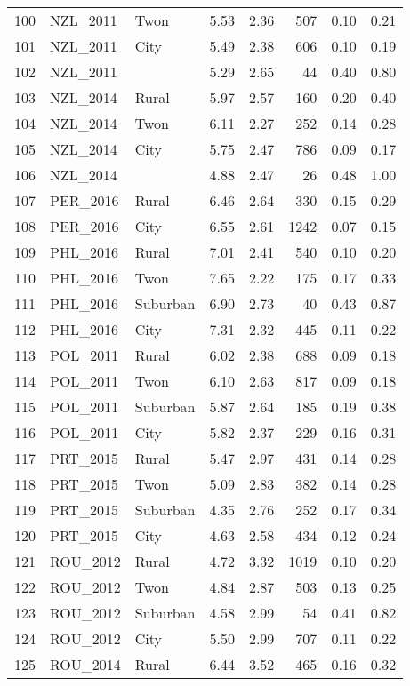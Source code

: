 \documentclass[12pt, titlepage]{article}
\begin{document}
\begin{table}[ht]
\begin{tabular}{rllrrrrr}
		100 & NZL\_2011 & Twon & 5.53 & 2.36 & 507 & 0.10 & 0.21 \\ 
		101 & NZL\_2011 & City & 5.49 & 2.38 & 606 & 0.10 & 0.19 \\ 
		102 & NZL\_2011 &  & 5.29 & 2.65 &  44 & 0.40 & 0.80 \\ 
		103 & NZL\_2014 & Rural & 5.97 & 2.57 & 160 & 0.20 & 0.40 \\ 
		104 & NZL\_2014 & Twon & 6.11 & 2.27 & 252 & 0.14 & 0.28 \\ 
		105 & NZL\_2014 & City & 5.75 & 2.47 & 786 & 0.09 & 0.17 \\ 
		106 & NZL\_2014 &  & 4.88 & 2.47 &  26 & 0.48 & 1.00 \\ 
		107 & PER\_2016 & Rural & 6.46 & 2.64 & 330 & 0.15 & 0.29 \\ 
		108 & PER\_2016 & City & 6.55 & 2.61 & 1242 & 0.07 & 0.15 \\ 
		109 & PHL\_2016 & Rural & 7.01 & 2.41 & 540 & 0.10 & 0.20 \\ 
		110 & PHL\_2016 & Twon & 7.65 & 2.22 & 175 & 0.17 & 0.33 \\ 
		111 & PHL\_2016 & Suburban & 6.90 & 2.73 &  40 & 0.43 & 0.87 \\ 
		112 & PHL\_2016 & City & 7.31 & 2.32 & 445 & 0.11 & 0.22 \\ 
		113 & POL\_2011 & Rural & 6.02 & 2.38 & 688 & 0.09 & 0.18 \\ 
		114 & POL\_2011 & Twon & 6.10 & 2.63 & 817 & 0.09 & 0.18 \\ 
		115 & POL\_2011 & Suburban & 5.87 & 2.64 & 185 & 0.19 & 0.38 \\ 
		116 & POL\_2011 & City & 5.82 & 2.37 & 229 & 0.16 & 0.31 \\ 
		117 & PRT\_2015 & Rural & 5.47 & 2.97 & 431 & 0.14 & 0.28 \\ 
		118 & PRT\_2015 & Twon & 5.09 & 2.83 & 382 & 0.14 & 0.28 \\ 
		119 & PRT\_2015 & Suburban & 4.35 & 2.76 & 252 & 0.17 & 0.34 \\ 
		120 & PRT\_2015 & City & 4.63 & 2.58 & 434 & 0.12 & 0.24 \\ 
		121 & ROU\_2012 & Rural & 4.72 & 3.32 & 1019 & 0.10 & 0.20 \\ 
		122 & ROU\_2012 & Twon & 4.84 & 2.87 & 503 & 0.13 & 0.25 \\ 
		123 & ROU\_2012 & Suburban & 4.58 & 2.99 &  54 & 0.41 & 0.82 \\ 
		124 & ROU\_2012 & City & 5.50 & 2.99 & 707 & 0.11 & 0.22 \\ 
		125 & ROU\_2014 & Rural & 6.44 & 3.52 & 465 & 0.16 & 0.32 \\ 

\end{tabular}
\end{table}
\end{document}
